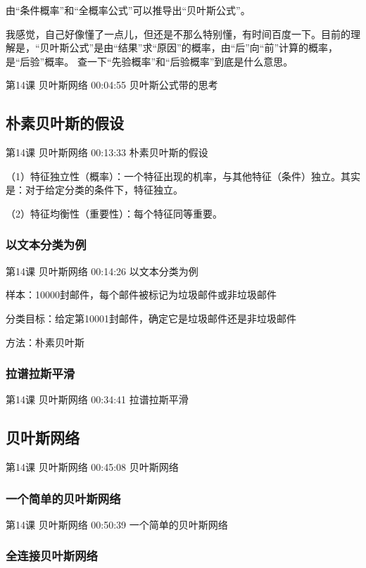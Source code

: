 \documentclass[UTF8]{ctexbook}
\begin{document}
由“条件概率”和“全概率公式”可以推导出“贝叶斯公式”。

我感觉，自己好像懂了一点儿，但还是不那么特别懂，有时间百度一下。目前的理解是，“贝叶斯公式”是由“结果”求“原因”的概率，由“后”向“前”计算的概率，是“后验”概率。 查一下“先验概率”和“后验概率”到底是什么意思。

第14课 贝叶斯网络 00:04:55 贝叶斯公式带的思考

\subsection{朴素贝叶斯的假设}

第14课 贝叶斯网络 00:13:33 朴素贝叶斯的假设

（1）特征独立性（概率）：一个特征出现的机率，与其他特征（条件）独立。其实是：对于给定分类的条件下，特征独立。

（2）特征均衡性（重要性）：每个特征同等重要。

\subsubsection{以文本分类为例}

第14课 贝叶斯网络 00:14:26 以文本分类为例

样本：10000封邮件，每个邮件被标记为垃圾邮件或非垃圾邮件

分类目标：给定第10001封邮件，确定它是垃圾邮件还是非垃圾邮件

方法：朴素贝叶斯

\subsubsection{拉谱拉斯平滑}

第14课 贝叶斯网络 00:34:41 拉谱拉斯平滑

\subsection{贝叶斯网络}

第14课 贝叶斯网络 00:45:08 贝叶斯网络

\subsubsection{一个简单的贝叶斯网络}

第14课 贝叶斯网络 00:50:39 一个简单的贝叶斯网络

\subsubsection{全连接贝叶斯网络}
\end{document}
